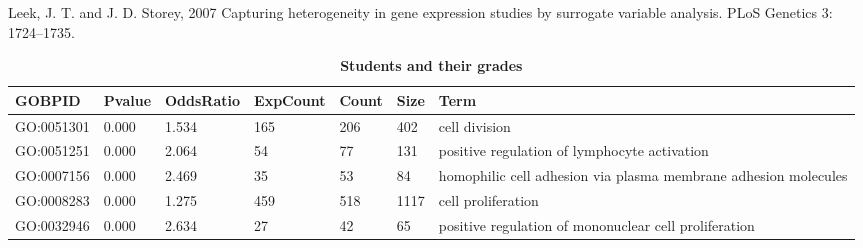 \documentclass[9pt,twocolumn,twoside]{gsajnl}
\begin{document}
Leek, J. T. and J. D. Storey, 2007 Capturing heterogeneity in gene expression studies by surrogate variable analysis. PLoS Genetics 3: 1724–1735.

\newcolumntype{b}{X}


\begin{table}[htbp]
\centering
\caption{\bf Students and their grades}
\begin{tableminipage}{\textwidth}
\begin{tabularx}{\textwidth}{ssssssb}
\hline
GOBPID & Pvalue & OddsRatio & ExpCount & Count & Size & Term\\
\hline

GO:0051301 & 0.000 & 1.534 & 165 & 206 & 402 & cell division\\
GO:0051251 & 0.000 & 2.064 & 54 & 77 & 131 & positive regulation of lymphocyte activation\\
GO:0007156 & 0.000 & 2.469 & 35 & 53 & 84 & homophilic cell adhesion via plasma membrane adhesion molecules\\
GO:0008283 & 0.000 & 1.275 & 459 & 518 & 1117 & cell proliferation\\
GO:0032946 & 0.000 & 2.634 & 27 & 42 & 65 & positive regulation of mononuclear cell proliferation\\
\hline
\end{tabularx}
  \label{tab:shape-functions}
\end{tableminipage}
\end{table}






\end{document}
